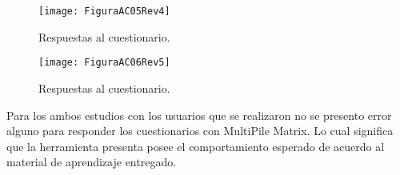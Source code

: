 \begin{figure}[h]
    \centering
    \texttt{[image: FiguraAC05Rev4]}
    \caption{Respuestas al cuestionario.}
    \label{fig:Rev4}
\end{figure}

\begin{figure}[h]
    \centering
    \texttt{[image: FiguraAC06Rev5]}
    \caption{Respuestas al cuestionario.}
    \label{fig:Rev5}
\end{figure}

Para los ambos estudios con los usuarios que se realizaron no se presento error alguno para responder los cuestionarios con MultiPile Matrix. Lo cual significa que la herramienta presenta posee el comportamiento esperado  de acuerdo al material de aprendizaje entregado.